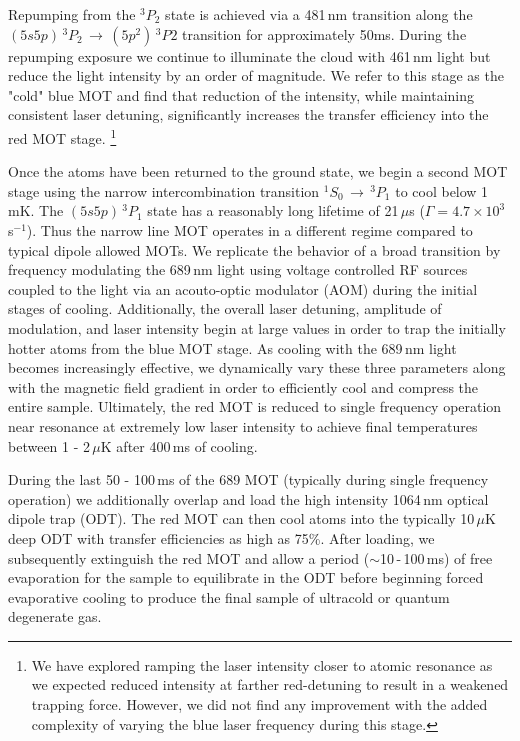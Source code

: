 Repumping from the $^3P_2$ state is achieved via a 481\,nm transition along the $(5s5p)\,^3P_2\,\rightarrow\,(5p^2)\,^3P2$ transition for approximately 50ms.
During the repumping exposure we continue to illuminate the cloud with 461\,nm light but reduce the light intensity by an order of magnitude.
We refer to this stage as the "cold" blue MOT and find that reduction of the intensity, while maintaining consistent laser detuning, significantly increases the transfer efficiency into the red MOT stage.
\footnote{We have explored ramping the laser intensity closer to atomic resonance as we expected reduced intensity at farther red-detuning to result in a weakened trapping force.
However, we did not find any improvement with the added complexity of varying the blue laser frequency during this stage.}

Once the atoms have been returned to the ground state, we begin a second MOT stage using the narrow intercombination transition $^1S_0\,\rightarrow\,^3P_1$ to cool below 1\,mK.
The $(5s5p)\,^3P_1$ state has a reasonably long lifetime of 21\,$\mu$s ($\Gamma=4.7\times10^3$\,s$^{-1}$).
Thus the narrow line MOT operates in a different regime compared to typical dipole allowed MOTs.
We replicate the behavior of a broad transition by frequency modulating the 689\,nm light using voltage controlled RF sources coupled to the light via an acouto-optic modulator (AOM) during the initial stages of cooling.
Additionally, the overall laser detuning, amplitude of modulation, and laser intensity begin at large values in order to trap the initially hotter atoms from the blue MOT stage. 
As cooling with the 689\,nm light becomes increasingly effective, we dynamically vary these three parameters along with the magnetic field gradient in order to efficiently cool and compress the entire sample.
Ultimately, the red MOT is reduced to single frequency operation near resonance at extremely low laser intensity to achieve final temperatures between 1 - 2\,$\mu$K after 400\,ms of cooling.

During the last 50 - 100\,ms of the 689 MOT (typically during single frequency operation) we additionally overlap and load the high intensity 1064\,nm optical dipole trap (ODT).
The red MOT can then cool atoms into the typically 10\,$\mu$K deep ODT with transfer efficiencies as high as 75\%. 
After loading, we subsequently extinguish the red MOT and allow a period ($\sim$10\,-\,100\,ms) of free evaporation for the sample to equilibrate in the ODT before beginning forced evaporative cooling to produce the final sample of ultracold or quantum degenerate gas.

